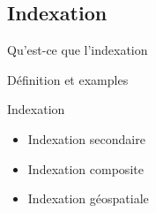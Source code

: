 \subsection{Indexation}

\begin{frame}{Qu'est-ce que l'indexation}

    Définition et examples

\end{frame}

\begin{frame}{Indexation}

    \begin{itemize}
        \item Indexation secondaire
        \item Indexation composite
        \item Indexation géospatiale
    \end{itemize}

\end{frame}
